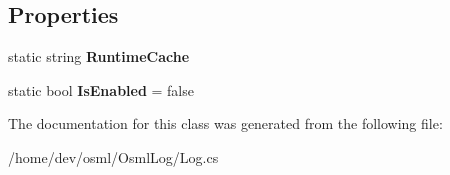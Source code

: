 \subsection*{Properties}
\begin{DoxyCompactItemize}
\item 
\mbox{\label{classOSML_1_1OsmLog_a6dcf786a9979183b54156f3b97a50e22}} 
static string {\bfseries Runtime\+Cache}
\item 
\mbox{\label{classOSML_1_1OsmLog_a186d2df30c9e139474731b3558a904a4}} 
static bool {\bfseries Is\+Enabled} = false
\end{DoxyCompactItemize}


The documentation for this class was generated from the following file\+:\begin{DoxyCompactItemize}
\item 
/home/dev/osml/\+Osml\+Log/Log.\+cs\end{DoxyCompactItemize}
